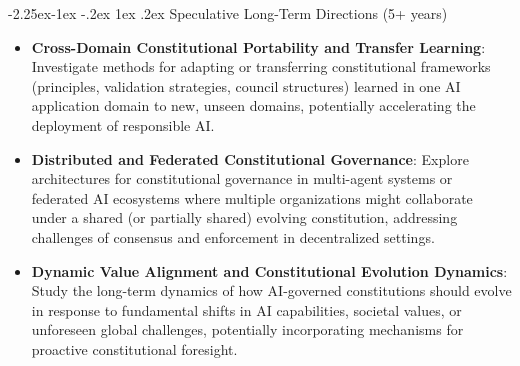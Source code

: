 \documentclass[manuscript,screen,review,anonymous,9pt]{acmart}
\makeatletter
\renewcommand\subsection{\@startsection{subsection}{2}{\z@}%
  {-2.25ex\@plus -1ex \@minus -.2ex}%
  {1ex \@plus .2ex}%
  {\normalfont\large\bfseries}}
\makeatother
\begin{document}
\subsection{Speculative Long-Term Directions (5+ years)}
\label{subsec:long_term_research}
\begin{itemize}[leftmargin=*,itemsep=1pt,parsep=1pt]
    \item \textbf{Cross-Domain Constitutional Portability and Transfer Learning}: Investigate methods for adapting or transferring constitutional frameworks (principles, validation strategies, council structures) learned in one AI application domain to new, unseen domains, potentially accelerating the deployment of responsible AI.
    \item \textbf{Distributed and Federated Constitutional Governance}: Explore architectures for constitutional governance in multi-agent systems or federated AI ecosystems where multiple organizations might collaborate under a shared (or partially shared) evolving constitution, addressing challenges of consensus and enforcement in decentralized settings.
    \item \textbf{Dynamic Value Alignment and Constitutional Evolution Dynamics}: Study the long-term dynamics of how AI-governed constitutions should evolve in response to fundamental shifts in AI capabilities, societal values, or unforeseen global challenges, potentially incorporating mechanisms for proactive constitutional foresight.
\end{itemize}
\end{document}
